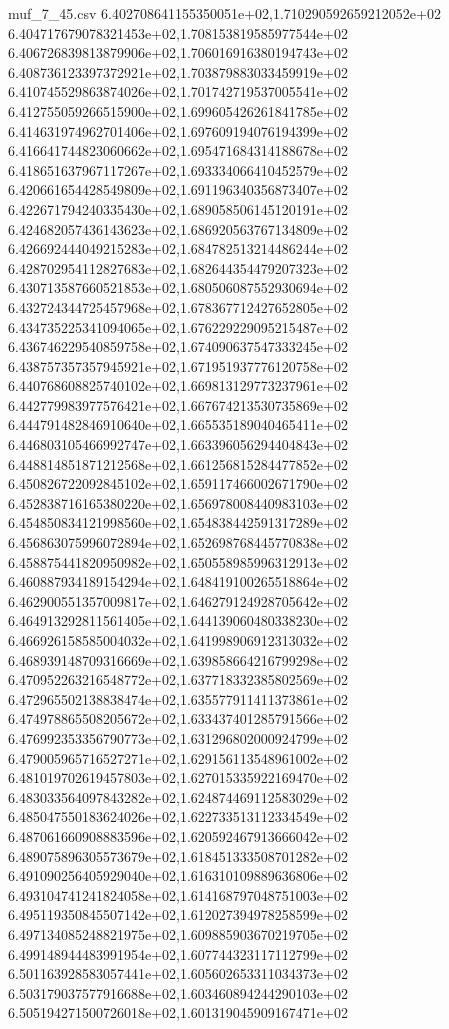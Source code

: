 \begin{filecontents*}{muf_7_45.csv}
6.402708641155350051e+02,1.710290592659212052e+02
6.404717679078321453e+02,1.708153819585977544e+02
6.406726839813879906e+02,1.706016916380194743e+02
6.408736123397372921e+02,1.703879883033459919e+02
6.410745529863874026e+02,1.701742719537005541e+02
6.412755059266515900e+02,1.699605426261841785e+02
6.414631974962701406e+02,1.697609194076194399e+02
6.416641744823060662e+02,1.695471684314188678e+02
6.418651637967117267e+02,1.693334066410452579e+02
6.420661654428549809e+02,1.691196340356873407e+02
6.422671794240335430e+02,1.689058506145120191e+02
6.424682057436143623e+02,1.686920563767134809e+02
6.426692444049215283e+02,1.684782513214486244e+02
6.428702954112827683e+02,1.682644354479207323e+02
6.430713587660521853e+02,1.680506087552930694e+02
6.432724344725457968e+02,1.678367712427652805e+02
6.434735225341094065e+02,1.676229229095215487e+02
6.436746229540859758e+02,1.674090637547333245e+02
6.438757357357945921e+02,1.671951937776120758e+02
6.440768608825740102e+02,1.669813129773237961e+02
6.442779983977576421e+02,1.667674213530735869e+02
6.444791482846910640e+02,1.665535189040465411e+02
6.446803105466992747e+02,1.663396056294404843e+02
6.448814851871212568e+02,1.661256815284477852e+02
6.450826722092845102e+02,1.659117466002671790e+02
6.452838716165380220e+02,1.656978008440983103e+02
6.454850834121998560e+02,1.654838442591317289e+02
6.456863075996072894e+02,1.652698768445770838e+02
6.458875441820950982e+02,1.650558985996312913e+02
6.460887934189154294e+02,1.648419100265518864e+02
6.462900551357009817e+02,1.646279124928705642e+02
6.464913292811561405e+02,1.644139060480338230e+02
6.466926158585004032e+02,1.641998906912313032e+02
6.468939148709316669e+02,1.639858664216799298e+02
6.470952263216548772e+02,1.637718332385802569e+02
6.472965502138838474e+02,1.635577911411373861e+02
6.474978865508205672e+02,1.633437401285791566e+02
6.476992353356790773e+02,1.631296802000924799e+02
6.479005965716527271e+02,1.629156113548961002e+02
6.481019702619457803e+02,1.627015335922169470e+02
6.483033564097843282e+02,1.624874469112583029e+02
6.485047550183624026e+02,1.622733513112334549e+02
6.487061660908883596e+02,1.620592467913666042e+02
6.489075896305573679e+02,1.618451333508701282e+02
6.491090256405929040e+02,1.616310109889636806e+02
6.493104741241824058e+02,1.614168797048751003e+02
6.495119350845507142e+02,1.612027394978258599e+02
6.497134085248821975e+02,1.609885903670219705e+02
6.499148944483991954e+02,1.607744323117112799e+02
6.501163928583057441e+02,1.605602653311034373e+02
6.503179037577916688e+02,1.603460894244290103e+02
6.505194271500726018e+02,1.601319045909167471e+02

\end{filecontents*}
